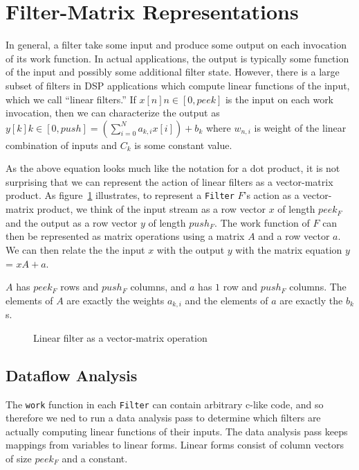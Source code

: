 \section{Filter-Matrix Representations}
In general, a filter take some input and produce some output on
each invocation of its work function. In actual applications, the output
is typically some function of the input and possibly some additional 
filter state. However, there is a large subset of filters in DSP applications
which compute linear functions of the input, which we call ``linear filters.''
If $x[n] n\in[0,peek]$ is the input on each work invocation, then we can 
characterize the output as  $y[k] k\in[0,push] = (\sum_{i=0}^{N} a_{k,i}x[i])+b_{k}$ 
where $w_{n,i}$ is weight of the linear combination of inputs and $C_{k}$ is some
constant value.

As the above equation looks much like the notation for a dot product, 
it is not surprising that we can represent the action of linear filters 
as a vector-matrix product. As figure~\ref{fig:overview-matrix} illustrates, 
to represent a {\tt Filter} $F$'s action as a vector-matrix product, we 
think of the input stream as a row vector $x$ of length $peek_{F}$
and the output as a row vector $y$ of length $push_{F}$. The work function
of $F$ can then be represented as matrix operations using a matrix $A$ and 
a row vector $a$. We can then relate the the input $x$ with the output $y$
with the matrix equation $y$ = $xA + a$. 

$A$ has $peek_{F}$ rows and $push_{F}$ columns, and $a$ has $1$ row 
and $push_{F}$ columns. The elements of $A$ are exactly the weights $a_{k,i}$ 
and the elements of $a$ are exactly the $b_{k}$s.

\begin{figure}
\center
\epsfxsize=2.5in
\caption{Linear filter as a vector-matrix operation}
\label{fig:overview-matrix}
\end{figure}

\subsection{Dataflow Analysis}
The {\tt work} function in each {\tt Filter} can contain arbitrary c-like code, 
and so therefore we ned to run a data analysis pass to determine which filters
are actually computing linear functions of their inputs. The data analysis pass
keeps mappings from variables to linear forms. Linear forms consist of column vectors
of size $peek_{F}$ and a constant.

